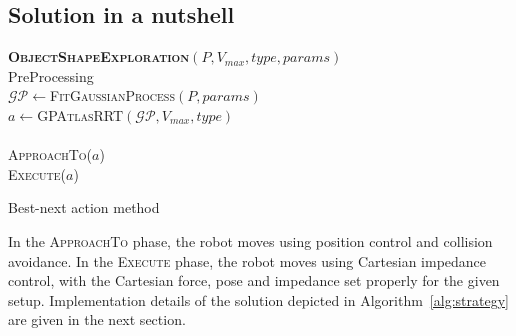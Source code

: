 \subsection{Solution in a nutshell}
\label{sec:summary}

\begin{algorithm}[h]
\textbf{\textsc{ObjectShapeExploration}}$(P, V_{max}, type, params)$\\ %
\LinesNumbered
\DontPrintSemicolon
\SetAlgoVlined {} 
  PreProcessing \\
  $\mathcal{GP} \leftarrow $\textsc{FitGaussianProcess}$(P, params)$\\
  {
    $a \leftarrow $\textsc{GPAtlasRRT}$(\mathcal{GP}, V_{max}, type)$ \\
    {
       \\
    }
    {
      \textsc{ApproachTo}($a$) \\
      \textsc{Execute}($a$) \\
    }
  }
  \Return 

\caption{Best-next action method} \label{algo:strategy}
\end{algorithm}

In the \textsc{ApproachTo} phase, the robot moves using position control and collision avoidance. In the \textsc{Execute} phase, the robot moves using Cartesian impedance control, with the Cartesian force, pose and impedance set properly for the given setup. Implementation details of the solution depicted in Algorithm~\ref{alg:strategy} are given in the next section.
